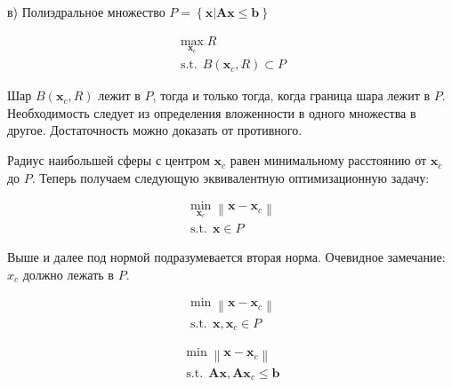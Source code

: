 \documentclass[12pt]{article}
\DeclareMathOperator*{\st}{s.t. }
\newcommand\norm[1]{\left\lVert#1\right\rVert}
\begin{document}
в) Полиэдральное множество $P = \left\{\textbf{x}\Big|\textbf{Ax}\leq \textbf{b}\right\}$

\begin{gather}
\max\limits_{\textbf{x}_c}R\\
\st\,B(\textbf{x}_c, R)\subset P
\end{gather}

Шар $B(\textbf{x}_c, R)$ лежит в $P$, тогда и только тогда, когда граница шара лежит в $P$. Необходимость следует из определения вложенности в одного множества в другое. Достаточность можно доказать от противного.

Радиус наибольшей сферы с центром $\textbf{x}_c$ равен минимальному расстоянию от $\textbf{x}_c$ до $P$. Теперь получаем следующую эквивалентную оптимизационную задачу:

\begin{gather}
\min\limits_{\textbf{x}_c}\norm{\textbf{x} - \textbf{x}_c}\\
\st\, \textbf{x}\in P
\end{gather}

Выше и далее под нормой подразумевается вторая норма. Очевидное замечание: $x_c$ должно лежать в $P$.

\begin{gather}
\min\norm{\textbf{x} - \textbf{x}_c}\\
\st\, \textbf{x}, \textbf{x}_c\in P
\end{gather}

\begin{gather}
\min\norm{\textbf{x} - \textbf{x}_c}\\
\st\, \textbf{Ax}, \textbf{Ax}_c \leq \textbf{b}
\end{gather}
\end{document}
